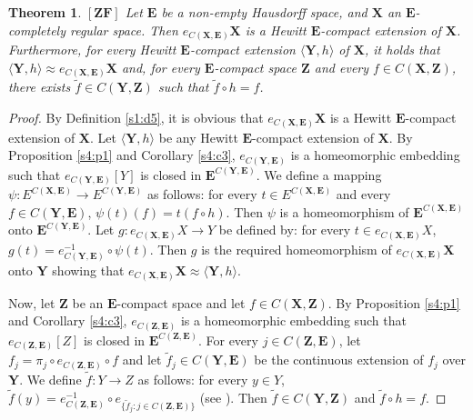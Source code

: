 \documentclass[12pt,twoside,leqno]{article}
\theoremstyle{plain}
\newtheorem{theorem}{Theorem}[section]
\theoremstyle{definition}
\theoremstyle{remark}
\begin{document}
\begin{theorem}
	\label{s4:t8}
	$[\mathbf{ZF}]$
	Let $\mathbf{E}$ be a non-empty Hausdorff space, and $\mathbf{X}$ an $\mathbf{E}$-completely regular space. Then $e_{C(\mathbf{X}, \mathbf{E})}\mathbf{X}$ is a Hewitt $\mathbf{E}$-compact extension of $\mathbf{X}$. Furthermore, for every Hewitt $\mathbf{E}$-compact extension $\langle \mathbf{Y}, h\rangle$ of $\mathbf{X}$, it holds that $\langle\mathbf{Y}, h\rangle\approx e_{C(\mathbf{X}, \mathbf{E})}\mathbf{X}$ and, for every $\mathbf{E}$-compact space $\mathbf{Z}$ and every $f\in C(\mathbf{X},\mathbf{Z})$, there exists $\tilde{f}\in C(\mathbf{Y}, \mathbf{Z})$ such that $\tilde{f}\circ h=f$.  
\end{theorem}
\begin{proof}
	By Definition \ref{s1:d5}, it is obvious that $e_{C(\mathbf{X}, \mathbf{E})}\mathbf{X}$ is a Hewitt $\mathbf{E}$-compact extension of $\mathbf{X}$. Let $\langle\mathbf{Y}, h\rangle$ be any Hewitt $\mathbf{E}$-compact extension of $\mathbf{X}$. By Proposition \ref{s4:p1} and Corollary \ref{s4:c3}, $e_{C(\mathbf{Y}, \mathbf{E})}$ is a homeomorphic embedding such that $e_{C(\mathbf{Y},\mathbf{E})}[Y]$ is closed in $\mathbf{E}^{C(\mathbf{Y}, \mathbf{E})}$. We define a mapping $\psi: E^{C(\mathbf{X}, \mathbf{E})}\to E^{C(\mathbf{Y},\mathbf{E})}$ as follows: for every $t\in E^{C(\mathbf{X}, \mathbf{E})}$ and every $f\in C(\mathbf{Y}, \mathbf{E})$, $\psi(t)(f)= t(f\circ h).$ Then $\psi$ is a homeomorphism of $\mathbf{E}^{C(\mathbf{X},\mathbf{E})}$ onto $\mathbf{E}^{C(\mathbf{Y},\mathbf{E})}$. Let $g: e_{C(\mathbf{X}, \mathbf{E})}X\to Y$ be defined by: for every $t\in e_{C(\mathbf{X}, \mathbf{E})}X$, $g(t)=e_{C(\mathbf{Y},\mathbf{E})}^{-1}\circ \psi(t)$. Then $g$ is the required homeomorphism of $e_{C(\mathbf{X}, \mathbf{E})}\mathbf{X}$ onto $\mathbf{Y}$ showing that $e_{C(\mathbf{X}, \mathbf{E})}\mathbf{X}\approx\langle \mathbf{Y}, h\rangle$.
	
	Now, let $\mathbf{Z}$ be an $\mathbf{E}$-compact space and let $f\in C(\mathbf{X},\mathbf{Z})$. By Proposition \ref{s4:p1} and Corollary \ref{s4:c3}, $e_{C(\mathbf{Z}, \mathbf{E})}$ is a homeomorphic embedding such that $e_{C(\mathbf{Z}, \mathbf{E})}[Z]$ is closed in $\mathbf{E}^{C(\mathbf{Z},\mathbf{E})}$. For every $j\in C(\mathbf{Z}, \mathbf{E})$, let $f_j=\pi_j\circ e_{C(\mathbf{Z}, \mathbf{E})}\circ f$  and let $\tilde{f}_j\in C(\mathbf{Y}, \mathbf{E})$ be the continuous extension of $f_j$ over $\mathbf{Y}$. We define $\tilde{f}: Y\to Z$ as follows: for every $y\in Y$, $\tilde{f}(y)=e_{C(\mathbf{Z},\mathbf{E})}^{-1}\circ e_{\{\tilde{f}_j: j\in C(\mathbf{Z}, \mathbf{E})\}}$ (see \cite[Lemma 3.11.15]{en}). Then $\tilde{f}\in C(\mathbf{Y},\mathbf{Z})$ and $\tilde{f}\circ h=f$.
\end{proof}
\end{document}

